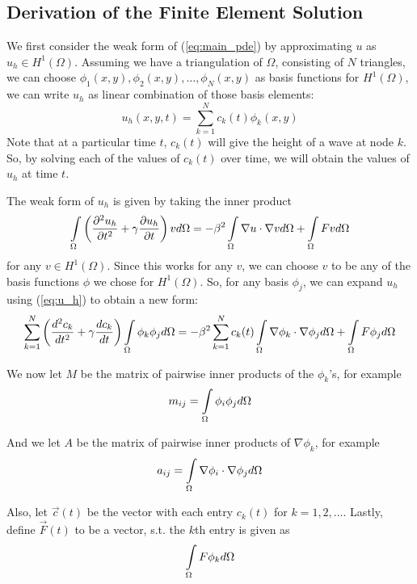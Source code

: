 \subsection{Derivation of the Finite Element Solution}
We first consider the weak form of (\ref{eq:main_pde}) by approximating $u$ as $u_h \in H^1(\Omega)$. Assuming we have
a triangulation of $\Omega$, consisting of $N$ triangles, we can choose 
$\phi_1(x,y), \phi_2(x,y), \ldots, \phi_N(x,y)$ as basis functions for $H^1(\Omega)$, we can write $u_h$ as linear
combination of those basis elements:
\begin{equation} \label{eq:u_h}
u_h(x,y,t) = \sum\limits_{k=1}^N c_k(t) \phi_k(x,y)
\end{equation}
Note that at a particular time $t$, $c_k(t)$ will give the height of a wave at node $k$. So, by solving each of the values
of $c_k(t)$ over time, we will obtain the values of $u_h$ at time $t$.

The weak form of $u_h$ is given by taking the inner product 
\begin{equation} \label{eq:u_h_weak_form}
\int\limits_{\Omega}  \left( \frac{\partial^2 u_h}{\partial t^2} + \gamma \frac{\partial u_h}{\partial t} \right)   v  d\Omega
=
- \beta^2 \int\limits_{\Omega} \nabla u \cdot \nabla v d\Omega
+ \int\limits_{\Omega} F v d\Omega
\end{equation}
for any $v \in H^1(\Omega)$. Since this works for any $v$, we can choose $v$ to be any of the basis functions $\phi$
we chose for $H^1(\Omega)$. So, for any basis $\phi_j$, we can expand $u_h$ using (\ref{eq:u_h}) to obtain a new form:
\begin{equation} \label{eq:u_h_weak_form_expanded}
\sum\limits_{k=1}^N \left( \frac{d^2 c_k}{d t^2} + \gamma\frac{d c_k}{d t} \right) \int\limits_{\Omega} \phi_k \phi_j d\Omega
=
- \beta^2\sum\limits_{k=1}^N c_k(t) \int\limits_{\Omega} \nabla \phi_k \cdot \nabla \phi_j d\Omega
+
\int\limits_{\Omega} F \phi_j d\Omega
\end{equation}

We now let $M$ be the matrix of pairwise inner products of the $\phi_k$'s, for example
\begin{equation} \label{eq:m_definition}
m_{ij} = \int\limits_{\Omega} \phi_i \phi_j d\Omega
\end{equation}

And we let $A$ be the matrix of pairwise inner products of $\nabla \phi_k$, for example
\begin{equation} \label{eq:a_definition}
a_{ij} = \int\limits_{\Omega} \nabla \phi_i \cdot \nabla \phi_j d\Omega
\end{equation}

Also, let $\vec{c}(t)$ be the vector with each entry $c_k(t)$ for $k=1, 2, \ldots$. Lastly, define
$\vec{F}(t)$ to be a vector, s.t. the $k$th entry is given as 
\begin{equation} \label{eq:vec_F_definition}
\int\limits_{\Omega} F \phi_k d\Omega
\end{equation}

